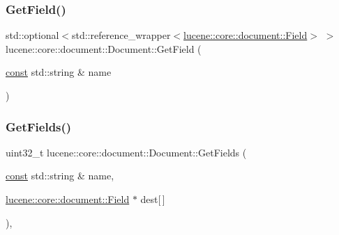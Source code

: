 \mbox{\label{classlucene_1_1core_1_1document_1_1Document_a30942eeb99fd914220503b9f68d9bd6a}} 
\subsubsection{\texorpdfstring{Get\+Field()}{GetField()}}
{\footnotesize\ttfamily std\+::optional$<$std\+::reference\+\_\+wrapper$<$\mbox{\hyperlink{classlucene_1_1core_1_1document_1_1Field}{lucene\+::core\+::document\+::\+Field}}$>$ $>$ lucene\+::core\+::document\+::\+Document\+::\+Get\+Field (\begin{DoxyParamCaption}\item[{\mbox{\hyperlink{ZlibCrc32_8h_a2c212835823e3c54a8ab6d95c652660e}{const}} std\+::string \&}]{name }\end{DoxyParamCaption})\hspace{0.3cm}{\ttfamily [inline]}}

\mbox{\label{classlucene_1_1core_1_1document_1_1Document_a8fcbb281ebfb1a4a075e189d099d3617}} 
\subsubsection{\texorpdfstring{Get\+Fields()}{GetFields()}\hspace{0.1cm}{\footnotesize\ttfamily [1/2]}}
{\footnotesize\ttfamily uint32\+\_\+t lucene\+::core\+::document\+::\+Document\+::\+Get\+Fields (\begin{DoxyParamCaption}\item[{\mbox{\hyperlink{ZlibCrc32_8h_a2c212835823e3c54a8ab6d95c652660e}{const}} std\+::string \&}]{name,  }\item[{\mbox{\hyperlink{classlucene_1_1core_1_1document_1_1Field}{lucene\+::core\+::document\+::\+Field}} $\ast$}]{dest\mbox{[}$\,$\mbox{]} }\end{DoxyParamCaption})\hspace{0.3cm}{\ttfamily [inline]}, {\ttfamily [noexcept]}}

